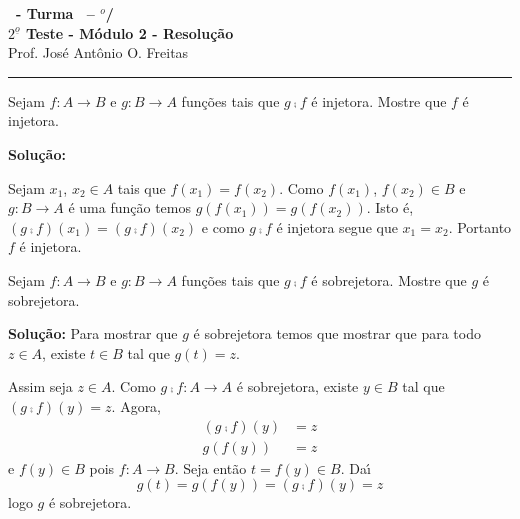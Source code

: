 \documentclass[12pt]{exam}
\begin{document}
\begin{center}
{\Large\bf \disciplina\ - Turma \turma\ -- \semestre$^{o}$/\ano} \\ \vspace{9pt} {\large\bf
$2^{\underline{o}}$ Teste - M\'odulo 2 - Resolu\c{c}\~ao}\\
\vspace{9pt} Prof. Jos{\'e} Ant{\^o}nio O. Freitas
\end{center}
\hrule

\vspace{.6cm}

\questao Sejam $f : A \to B$ e $g : B \to A$ fun\c{c}\~oes tais que $g \comp f$ \'e injetora. Mostre que $f$ \'e injetora.

\noindent\textbf{Solu\c{c}\~ao:}

    Sejam $x_1$, $x_2 \in A$ tais que $f(x_1) = f(x_2)$. Como $f(x_1)$, $f(x_2) \in B$ e $g : B \to A$ \'e uma fun\c{c}\~ao temos $g(f(x_1)) = g(f(x_2))$. Isto \'e, $(g \comp f)(x_1) = (g \comp f)(x_2)$ e como $g \comp f$ \'e injetora segue que $x_1 = x_2$. Portanto $f$ \'e injetora.

\vspace{.5cm}

\questao Sejam $f : A \to B$ e $g : B \to A$ fun\c{c}\~oes tais que $g \comp f$ \'e sobrejetora. Mostre que $g$ \'e sobrejetora.

\noindent\textbf{Solu\c{c}\~ao:} Para mostrar que $g$ \'e sobrejetora temos que mostrar que para todo $z \in A$, existe $t \in B$ tal que $g(t) = z$.

Assim seja $z \in A$. Como $g \comp f : A \to A$ \'e sobrejetora, existe $y \in B$ tal que $(g\comp f)(y) = z$. Agora,
\begin{align*}
    (g\comp f)(y) &= z\\
    g(f(y)) &= z
\end{align*}
e $f(y) \in B$ pois $f : A \to B$. Seja ent\~ao $t = f(y) \in B$. Da{\'\i}
\[
    g(t) = g(f(y)) = (g \comp f)(y) = z
\]
logo $g$ \'e sobrejetora.
\end{document}
